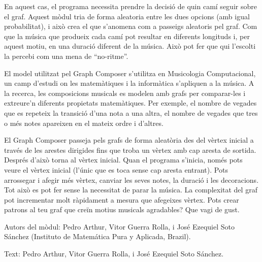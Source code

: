 En aquest cas, el programa necessita prendre la decisió de quin camí seguir sobre el graf. Aquest mòdul tria de forma aleatoria entre les dues opcions (amb igual probabilitat), i això crea el que s'anomena com a passeigs aleatoris pel graf. Com que la música que produeix cada camí pot resultar en diferents longituds i, per aquest motiu, en una duració diferent de la música. Això pot fer que qui l'escolti la percebi com una mena de ``no-ritme''.

El model utilitzat pel Graph Composer s'utilitza en Musicologia Computacional, un camp d'estudi on les matemàtiques i la informàtica s'apliquen a la música. A la recerca, les composicions musicals es modelen amb grafs per comparar-les i extreure'n diferents propietats matemàtiques. Per exemple, el nombre de vegades que es repeteix la transició d'una nota a una altra, el nombre de vegades que tres o més notes apareixen en el mateix ordre i d'altres.

El Graph Composer passeja pels grafs de forma aleatòria des del vèrtex inicial a través de les arestes dirigides fins que troba un vèrtex amb cap aresta de sortida. Després d'això torna al vèrtex inicial. Quan el programa s'inicia, només pots veure el vèrtex inicial (l'únic que es toca sense cap aresta entrant). Pots arrossegar i afegir més vèrtex, canviar les seves notes, la duració i les decoracions. Tot això es pot fer sense la necessitat de parar la música. La complexitat del graf pot incrementar molt ràpidament a mesura que afegeixes vèrtex. Pots crear patrons al teu graf que creïn motius musicals agradables? Que vagi de gust.

\begin{sectcredits}
\item[Autors del mòdul:] Pedro Arthur, Vitor Guerra Rolla, i José Ezequiel Soto Sánchez (Instituto de Matemática Pura y Aplicada, Brazil).

\item[Text:] Pedro Arthur, Vitor Guerra Rolla, i José Ezequiel Soto Sánchez.

\end{sectcredits}
